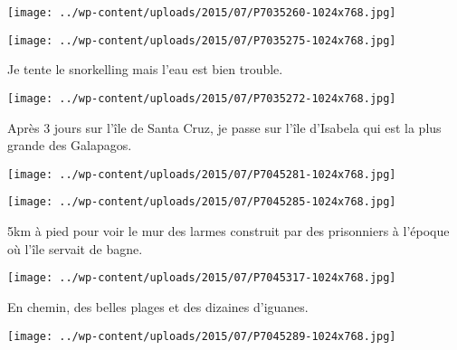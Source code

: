  

 

\begin{center} \texttt{[image: ../wp-content/uploads/2015/07/P7035260-1024x768.jpg]} \end{center}

 

 

\begin{center} \texttt{[image: ../wp-content/uploads/2015/07/P7035275-1024x768.jpg]} \end{center}

 

 Je tente le snorkelling mais l'eau est bien trouble. 

 

\begin{center} \texttt{[image: ../wp-content/uploads/2015/07/P7035272-1024x768.jpg]} \end{center}

 

 Après 3 jours sur l'île de Santa Cruz, je passe sur l'île d'Isabela qui est la plus grande des Galapagos. 

 

\begin{center} \texttt{[image: ../wp-content/uploads/2015/07/P7045281-1024x768.jpg]} \end{center}

 

 

\begin{center} \texttt{[image: ../wp-content/uploads/2015/07/P7045285-1024x768.jpg]} \end{center}

 

 5km à pied pour voir le mur des larmes construit par des prisonniers à l'époque où l'île servait de bagne. 

 

\begin{center} \texttt{[image: ../wp-content/uploads/2015/07/P7045317-1024x768.jpg]} \end{center}

 

 En chemin, des belles plages et des dizaines d'iguanes. 

 

\begin{center} \texttt{[image: ../wp-content/uploads/2015/07/P7045289-1024x768.jpg]} \end{center}

